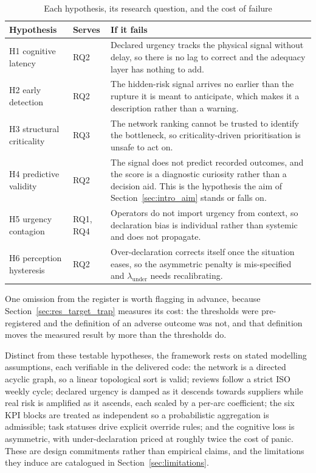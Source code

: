 \begin{table}[htbp]
\centering
\caption{Each hypothesis, its research question, and the cost of failure}
\label{tab:rq_hypothesis_map}
\small
\begin{tabularx}{\linewidth}{l >{\centering\arraybackslash}p{1.4cm} X}
\toprule
\textbf{Hypothesis} & \textbf{Serves} & \textbf{If it fails} \\
\midrule
H1 cognitive latency & RQ2 & Declared urgency tracks the physical signal without delay, so
there is no lag to correct and the adequacy layer has nothing to add. \\
H2 early detection & RQ2 & The hidden-risk signal arrives no earlier than the rupture it is
meant to anticipate, which makes it a description rather than a warning. \\
H3 structural criticality & RQ3 & The network ranking cannot be trusted to identify the
bottleneck, so criticality-driven prioritisation is unsafe to act on. \\
H4 predictive validity & RQ2 & The signal does not predict recorded outcomes, and the score
is a diagnostic curiosity rather than a decision aid. This is the hypothesis the aim of
Section~\ref{sec:intro_aim} stands or falls on. \\
H5 urgency contagion & RQ1, RQ4 & Operators do not import urgency from context, so
declaration bias is individual rather than systemic and does not propagate. \\
H6 perception hysteresis & RQ2 & Over-declaration corrects itself once the situation eases,
so the asymmetric penalty is mis-specified and $\lambda_{\text{under}}$ needs
recalibrating. \\
\bottomrule
\end{tabularx}
\end{table}

One omission from the register is worth flagging in advance, because
Section~\ref{sec:res_target_trap} measures its cost: the thresholds were pre-registered and the
definition of an adverse outcome was not, and that definition moves the measured result by more
than the thresholds do.

Distinct from these testable hypotheses, the framework rests on stated modelling assumptions,
each verifiable in the delivered code: the network is a directed acyclic graph, so a linear
topological sort is valid; reviews follow a strict ISO weekly cycle; declared urgency is damped
as it descends towards suppliers while real risk is amplified as it ascends, each scaled by a
per-arc coefficient; the six KPI blocks are treated as independent so a probabilistic
aggregation is admissible; task statuses drive explicit override rules; and the cognitive loss
is asymmetric, with under-declaration priced at roughly twice the cost of panic. These are
design commitments rather than empirical claims, and the limitations they induce are
catalogued in Section~\ref{sec:limitations}.

